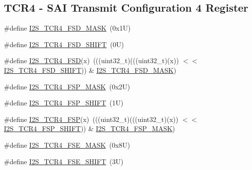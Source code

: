 \subsection*{T\+C\+R4 -\/ S\+AI Transmit Configuration 4 Register}
\begin{DoxyCompactItemize}
\item 
\#define \mbox{\hyperlink{group___i2_s___register___masks_ga895aea8d5cc09529dfca99dc5c511644}{I2\+S\+\_\+\+T\+C\+R4\+\_\+\+F\+S\+D\+\_\+\+M\+A\+SK}}~(0x1\+U)
\item 
\#define \mbox{\hyperlink{group___i2_s___register___masks_ga61e4999938fd48b7f2f316e1563277ec}{I2\+S\+\_\+\+T\+C\+R4\+\_\+\+F\+S\+D\+\_\+\+S\+H\+I\+FT}}~(0\+U)
\item 
\#define \mbox{\hyperlink{group___i2_s___register___masks_gabdece778125e163ce2b777e766056596}{I2\+S\+\_\+\+T\+C\+R4\+\_\+\+F\+SD}}(x)~(((uint32\+\_\+t)(((uint32\+\_\+t)(x)) $<$$<$ \mbox{\hyperlink{group___i2_s___register___masks_ga61e4999938fd48b7f2f316e1563277ec}{I2\+S\+\_\+\+T\+C\+R4\+\_\+\+F\+S\+D\+\_\+\+S\+H\+I\+FT}})) \& \mbox{\hyperlink{group___i2_s___register___masks_ga895aea8d5cc09529dfca99dc5c511644}{I2\+S\+\_\+\+T\+C\+R4\+\_\+\+F\+S\+D\+\_\+\+M\+A\+SK}})
\item 
\#define \mbox{\hyperlink{group___i2_s___register___masks_ga040aed413399e30e47219d040ff46c9d}{I2\+S\+\_\+\+T\+C\+R4\+\_\+\+F\+S\+P\+\_\+\+M\+A\+SK}}~(0x2\+U)
\item 
\#define \mbox{\hyperlink{group___i2_s___register___masks_ga48dba321e9103f28b6b66b072dae99b7}{I2\+S\+\_\+\+T\+C\+R4\+\_\+\+F\+S\+P\+\_\+\+S\+H\+I\+FT}}~(1\+U)
\item 
\#define \mbox{\hyperlink{group___i2_s___register___masks_ga90a199149352bad62faa547f0a423b4d}{I2\+S\+\_\+\+T\+C\+R4\+\_\+\+F\+SP}}(x)~(((uint32\+\_\+t)(((uint32\+\_\+t)(x)) $<$$<$ \mbox{\hyperlink{group___i2_s___register___masks_ga48dba321e9103f28b6b66b072dae99b7}{I2\+S\+\_\+\+T\+C\+R4\+\_\+\+F\+S\+P\+\_\+\+S\+H\+I\+FT}})) \& \mbox{\hyperlink{group___i2_s___register___masks_ga040aed413399e30e47219d040ff46c9d}{I2\+S\+\_\+\+T\+C\+R4\+\_\+\+F\+S\+P\+\_\+\+M\+A\+SK}})
\item 
\#define \mbox{\hyperlink{group___i2_s___register___masks_ga1431c095df0a4ca821052d83ca72ca96}{I2\+S\+\_\+\+T\+C\+R4\+\_\+\+F\+S\+E\+\_\+\+M\+A\+SK}}~(0x8\+U)
\item 
\#define \mbox{\hyperlink{group___i2_s___register___masks_ga967f80d877a02e10cfe3041c0547c67f}{I2\+S\+\_\+\+T\+C\+R4\+\_\+\+F\+S\+E\+\_\+\+S\+H\+I\+FT}}~(3\+U)
\item 

\end{DoxyCompactItemize}
